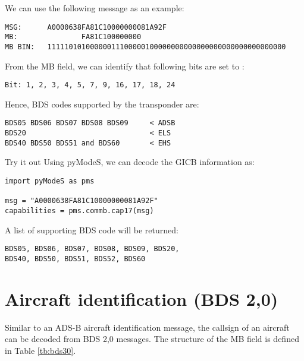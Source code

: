 We can use the following message as an example:

\begin{verbatim}
MSG:      A0000638FA81C10000000081A92F
MB:               FA81C100000000
MB BIN:   11111010100000011100000100000000000000000000000000000000
\end{verbatim}

From the MB field, we can identify that following bits are set to \1:

\begin{verbatim}
Bit: 1, 2, 3, 4, 5, 7, 9, 16, 17, 18, 24
\end{verbatim}

Hence, BDS codes supported by the transponder are: 
\begin{verbatim}
BDS05 BDS06 BDS07 BDS08 BDS09     < ADSB
BDS20                             < ELS
BDS40 BDS50 BDS51 and BDS60       < EHS
\end{verbatim}
  
\begin{notebox}{Try it out}
Using pyModeS, we can decode the GICB information as: 

\begin{verbatim}
import pyModeS as pms

msg = "A0000638FA81C10000000081A92F"
capabilities = pms.commb.cap17(msg)
\end{verbatim}

A list of supporting BDS code will be returned:

\begin{verbatim}
BDS05, BDS06, BDS07, BDS08, BDS09, BDS20, 
BDS40, BDS50, BDS51, BDS52, BDS60
\end{verbatim}

\end{notebox}

\clearpage

\section{Aircraft identification (BDS 2,0)}

Similar to an ADS-B aircraft identification message, the callsign of an aircraft can be decoded from BDS 2,0 messages. The structure of the MB field is defined in Table \ref{tb:bds30}.

